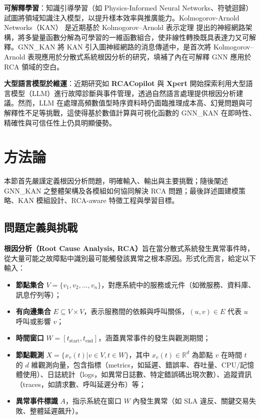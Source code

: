 \documentclass[10pt,a4paper,twocolumn]{article}
\begin{document}
\textbf{可解釋學習}：知識引導學習（如 Physics-Informed Neural Networks、符號迴歸）試圖將領域知識注入模型，以提升樣本效率與推廣能力。Kolmogorov-Arnold Networks（KAN）\cite{kan2024} 是近期基於 Kolmogorov–Arnold 表示定理 \cite{kolmogorov1957} 提出的神經網路架構，將多變量函數分解為可學習的一維函數組合，使非線性轉換既具表達力又可解釋。GNN\_KAN 將 KAN 引入圖神經網路的消息傳遞中，是首次將 Kolmogorov–Arnold 表現應用於分散式系統根因分析的研究，填補了內在可解釋 GNN 應用於 RCA 領域的空白。

\textbf{大型語言模型於維運}：近期研究如 \textbf{RCACopilot} \cite{rcacopilot2024} 與 \textbf{Xpert} \cite{xpert2024} 開始探索利用大型語言模型（LLM）進行故障診斷與事件管理，透過自然語言處理提供根因分析建議。然而，LLM 在處理高頻數值型時序資料時仍面臨推理成本高、幻覺問題與可解釋性不足等挑戰，這使得基於數值計算與可視化函數的 GNN\_KAN 在即時性、精確性與可信任性上仍具明顯優勢。

\section{方法論}

本節首先嚴謹定義根因分析問題，明確輸入、輸出與主要挑戰；隨後闡述 GNN\_KAN 之整體架構及各模組如何協同解決 RCA 問題；最後詳述圖建模策略、KAN 模組設計、RCA-aware 特徵工程與學習目標。

\subsection{問題定義與挑戰}

\textbf{根因分析（Root Cause Analysis, RCA）}旨在當分散式系統發生異常事件時，從大量可能之故障點中識別最可能觸發該異常之根本原因。形式化而言，給定以下輸入：

\begin{itemize}
\item \textbf{節點集合} $V = \{v_1, v_2, ..., v_n\}$，對應系統中的服務或元件（如微服務、資料庫、訊息佇列等）；
\item \textbf{有向邊集合} $E \subseteq V \times V$，表示服務間的依賴與呼叫關係，$(u, v) \in E$ 代表 $u$ 呼叫或影響 $v$；
\item \textbf{時間窗口} $W = [t_{\text{start}}, t_{\text{end}}]$，涵蓋異常事件的發生與觀測期間；
\item \textbf{節點觀測} $X = \{x_v(t) | v \in V, t \in W\}$，其中 $x_v(t) \in \mathbb{R}^d$ 為節點 $v$ 在時間 $t$ 的 $d$ 維觀測向量，包含指標（metrics，如延遲、錯誤率、吞吐量、CPU/記憶體使用）、日誌統計（logs，如異常日誌數、特定錯誤碼出現次數）、追蹤資訊（traces，如請求數、呼叫延遲分布）等；
\item \textbf{異常事件標識} $A$，指示系統在窗口 $W$ 內發生異常（如 SLA 違反、關鍵交易失敗、整體延遲飆升）。
\end{itemize}
\end{document}
